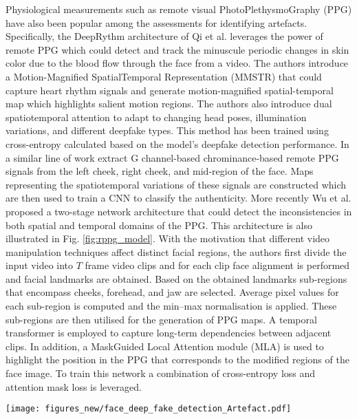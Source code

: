 Physiological measurements such as remote
visual PhotoPlethysmoGraphy (PPG) have also been popular among the assessments for identifying artefacts. Specifically, the DeepRythm architecture of Qi et al. \cite{qi2020deeprhythm} leverages the power of remote PPG which could detect and track the minuscule periodic changes in skin color due to the blood flow through the face from a video. The authors introduce a Motion-Magnified SpatialTemporal Representation (MMSTR) that could capture heart rhythm signals and generate motion-magnified
spatial-temporal map which highlights salient motion regions. The authors also introduce dual spatiotemporal attention to adapt to changing head poses, illumination variations, and different deepfake types. This method has been trained using cross-entropy calculated based on the model's deepfake detection performance. In a similar line of work \cite{ciftci2020fakecatcher} extract G channel-based \cite{zhao2018novel} chrominance-based \cite{de2013robust} remote PPG signals from the left cheek, right cheek, and mid-region of the face. Maps representing the spatiotemporal variations of these signals are constructed which are then used to train a CNN to classify the authenticity. More recently Wu et al. \cite{wu2024local} proposed a two-stage network architecture that could detect the inconsistencies in both spatial and temporal domains of the PPG. This architecture is also illustrated in Fig. \ref{fig:rppg_model}. With the motivation that different video manipulation techniques affect distinct facial regions, the authors first divide the input video into $T$ frame video clips and for each clip face alignment is performed and facial landmarks are obtained. Based on the obtained landmarks sub-regions that encompass cheeks, forehead, and jaw are selected. Average pixel values for each sub-region is computed and the min–max normalisation is applied. These sub-regions are then utilised for the generation of PPG maps. A temporal transformer is employed to capture long-term dependencies between adjacent clips. In addition, a MaskGuided Local Attention module (MLA) is used to highlight the position in the PPG that corresponds to the
modified regions of the face image. To train this network a combination of cross-entropy loss and attention mask loss is leveraged. 

\begin{figure*}[htbp]
    \centering
    \texttt{[image: figures\_new/face\_deep\_fake\_detection\_Artefact.pdf]}
    \caption{Two-stage network architecture proposed in \cite{wu2024local} which analyses rPPG signals extracted from face, and analyses irregularities in light absorption in facial skin tissues.}
    \label{fig:rppg_model}
\end{figure*}

